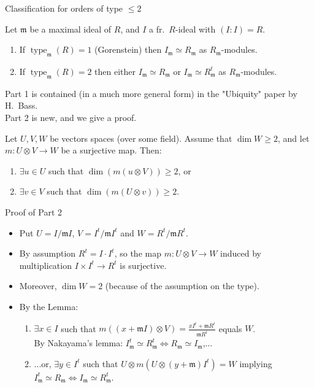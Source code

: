 \documentclass[usenames,dvipsnames]{beamer}
\DeclareMathOperator{\type}{type}
\renewcommand{\frm}{{\mathfrak m}}
\begin{document}
\begin{frame}{ Classification for orders of type $\leq 2$ } 
    \begin{theorem}
        Let $\frm$ be a maximal ideal of $R$, and $I$ a fr.~$R$-ideal with $(I:I)=R$.
        \begin{enumerate}
            \item \pause If $\type_\frm(R)=1$ (Gorenstein) then $I_\frm\simeq R_\frm$ as $R_\frm$-modules.
            \item \pause If $\type_\frm(R)=2$ then either $I_\frm\simeq R_\frm$ or $I_\frm\simeq R^t_\frm$  as $R_\frm$-modules.
        \end{enumerate}
    \end{theorem}

    \pause Part 1 is contained (in a much more general form) in the "Ubiquity" paper by H.~Bass.\\
    Part 2 is new, and we give a proof.
    \pause 
\begin{lemma}
    Let $U,V,W$ be vectors spaces (over some field). Assume that $\dim W \ge 2$, and let $m: U\otimes V\to W$ be a surjective map. Then:
    \begin{enumerate}
        \item \pause $\exists u\in U$ such that $\dim(m(u\otimes V)) \ge 2$, or
        \item \pause $\exists v\in V$ such that $\dim(m(U\otimes v)) \ge 2$.
    \end{enumerate}
\end{lemma}

\end{frame}


\begin{frame}{ Proof of Part 2 } 
    \begin{itemize}
    \item \pause Put $U = I/\frm I$, $V = I^t/\frm I^t$ and $W = R^t/\frm R^t$.
    \item \pause By assumption $R^t = I \cdot I^t$, so the map $ m: U \otimes V \to W $ induced by multiplication $I \times I^t \to R^t$
    is surjective.
    \item \pause Moreover, $\dim W = 2$ (because of the assumption on the type).
    \item \pause By the Lemma:
    \begin{enumerate}
        \item $\exists x \in I$ such that $m( (x+\frm I) \otimes V  ) = \frac{x I^t + \frm R^t }{ \frm R^t }$ equals $W$.\\
            By Nakayama's lemma: $I_\frm^t\simeq R_\frm^t \iff R_\frm\simeq I_\frm $,...
        \item \pause ...or, $\exists y \in I^t$ such that $U \otimes m( U \otimes (y+\frm) I^t ) = W $ implying $I^t_\frm \simeq R_\frm \iff I_\frm \simeq R^t_\frm$.
    \end{enumerate}
	\end{itemize}
\end{frame}
\end{document}
